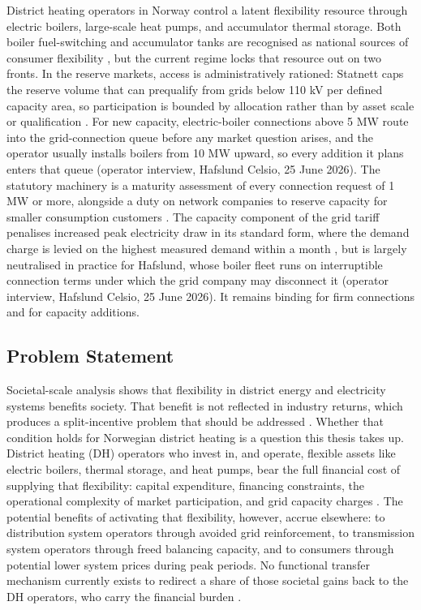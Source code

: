 District heating operators in Norway control a latent flexibility resource through electric boilers, large-scale heat pumps, and accumulator thermal storage. Both boiler fuel-switching and accumulator tanks are recognised as national sources of consumer flexibility \cite{energikommisjonen_mer_2023}, but the current regime locks that resource out on two fronts. In the reserve markets, access is administratively rationed: Statnett caps the reserve volume that can prequalify from grids below 110 kV per defined capacity area, so participation is bounded by allocation rather than by asset scale or qualification \cite{statnett_innforing_2026}. For new capacity, electric-boiler connections above 5 MW route into the grid-connection queue before any market question arises, and the operator usually installs boilers from 10 MW upward, so every addition it plans enters that queue (operator interview, Hafslund Celsio, 25 June 2026). The statutory machinery is a maturity assessment of every connection request of 1 MW or more, alongside a duty on network companies to reserve capacity for smaller consumption customers \cite{energidepartementet_forskrift_2019}. The capacity component of the grid tariff penalises increased peak electricity draw in its standard form, where the demand charge is levied on the highest measured demand within a month \cite{kirkerud_impacts_2016}, but is largely neutralised in practice for Hafslund, whose boiler fleet runs on interruptible connection terms under which the grid company may disconnect it (operator interview, Hafslund Celsio, 25 June 2026). It remains binding for firm connections and for capacity additions.


\subsection{Problem Statement}
\label{1-subsec:1.2 problem statement}
Societal-scale analysis shows that flexibility in district energy and electricity systems benefits society. That benefit is not reflected in industry returns, which produces a split-incentive problem that should be addressed \cite{sneum_barriers_2021}. Whether that condition holds for Norwegian district heating is a question this thesis takes up. District heating (DH) operators who invest in, and operate, flexible assets like electric boilers, thermal storage, and heat pumps, bear the full financial cost of supplying that flexibility: capital expenditure, financing constraints, the operational complexity of market participation, and grid capacity charges \cite{sneum_barriers_2021}. The potential benefits of activating that flexibility, however, accrue elsewhere: to distribution system operators through avoided grid reinforcement, to transmission system operators through freed balancing capacity, and to consumers through potential lower system prices during peak periods. No functional transfer mechanism currently exists to redirect a share of those societal gains back to the DH operators, who carry the financial burden \cite{Thema_fjernvarme_2024}.

